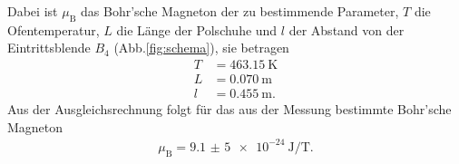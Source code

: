 Dabei ist $\mu_{\mathrm{B}}$ das Bohr'sche Magneton der zu bestimmende Parameter, $T$ die Ofentemperatur,
$L$ die Länge der Polschuhe und $l$ der Abstand von der Eintrittsblende $B_4$ (Abb.\ref{fig:schema}),
sie betragen
\begin{align}
  T&=\SI{463,15}{\kelvin}\\
  L&=\SI{0,070}{\meter}\\
  l&=\SI{0,455}{\meter}.
\end{align}
Aus der Ausgleichsrechnung folgt für das aus der Messung bestimmte
Bohr'sche Magneton
\begin{align}
\mu_{\mathrm{B}}=\SI{9,1(5) e-24}{\joule\per\tesla }.
\end{align}
